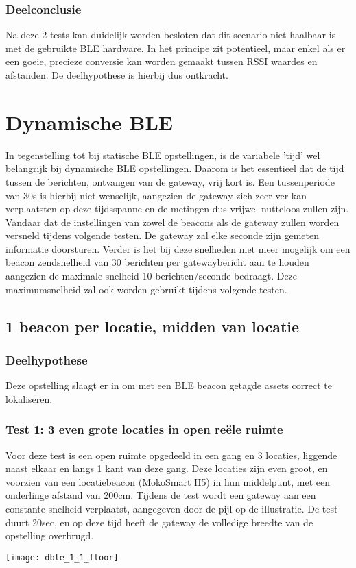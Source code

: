 \subsubsection{Deelconclusie}
Na deze 2 tests kan duidelijk worden besloten dat dit scenario niet haalbaar is met de gebruikte BLE hardware. In het principe zit potentieel, maar enkel als er een goeie, precieze conversie kan worden gemaakt tussen RSSI waardes en afstanden. De deelhypothese is hierbij dus ontkracht.

\section{Dynamische BLE}
In tegenstelling tot bij statische BLE opstellingen, is de variabele 'tijd' wel belangrijk bij dynamische BLE opstellingen. Daarom is het essentieel dat de tijd tussen de berichten, ontvangen van de gateway, vrij kort is. Een tussenperiode van 30s is hierbij niet wenselijk, aangezien de gateway zich zeer ver kan verplaatsten op deze tijdsspanne en de metingen dus vrijwel nutteloos zullen zijn. Vandaar dat de instellingen van zowel de beacons als de gateway zullen worden versneld tijdens volgende testen. De gateway zal elke seconde zijn gemeten informatie doorsturen. Verder is het bij deze snelheden niet meer mogelijk om een beacon zendsnelheid van 30 berichten per gatewaybericht aan te houden aangezien de maximale snelheid 10 berichten/seconde bedraagt. Deze maximumsnelheid zal ook worden gebruikt tijdens volgende testen.

\subsection{1 beacon per locatie, midden van locatie}
\subsubsection{Deelhypothese}
Deze opstelling slaagt er in om met een BLE beacon getagde assets correct te lokaliseren.

\subsubsection{Test 1: 3 even grote locaties in open reële ruimte}
\begin{minipage}{0.55\textwidth}
Voor deze test is een open ruimte opgedeeld in een gang en 3 locaties, liggende naast elkaar en langs 1 kant van deze gang. Deze locaties zijn even groot, en voorzien van een locatiebeacon (MokoSmart H5) in hun middelpunt, met een onderlinge afstand van 200cm. Tijdens de test wordt een gateway aan een constante snelheid verplaatst, aangegeven door de pijl op de illustratie. De test duurt 20sec, en op deze tijd heeft de gateway de volledige breedte van de opstelling overbrugd. 
\end{minipage}
\hfill
\begin{minipage}{0.42\textwidth}
	\texttt{[image: dble\_1\_1\_floor]}
	\label{fig:ond-ble-dynamic-1-1-ops}
\end{minipage}

